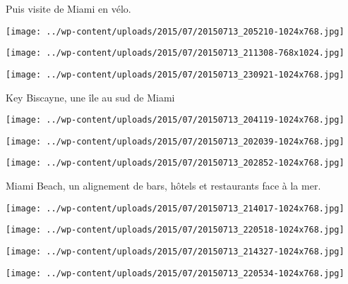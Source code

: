 Puis visite de Miami en vélo. 
\begin{center} \texttt{[image: ../wp-content/uploads/2015/07/20150713\_205210-1024x768.jpg]} \end{center}
\begin{center} \texttt{[image: ../wp-content/uploads/2015/07/20150713\_211308-768x1024.jpg]} \end{center}
\begin{center} \texttt{[image: ../wp-content/uploads/2015/07/20150713\_230921-1024x768.jpg]} \end{center}

Key Biscayne, une île au sud de Miami 
\begin{center} \texttt{[image: ../wp-content/uploads/2015/07/20150713\_204119-1024x768.jpg]} \end{center}
\begin{center} \texttt{[image: ../wp-content/uploads/2015/07/20150713\_202039-1024x768.jpg]} \end{center}
\begin{center} \texttt{[image: ../wp-content/uploads/2015/07/20150713\_202852-1024x768.jpg]} \end{center}
\pagebreak

Miami Beach, un alignement de bars, hôtels et restaurants face à la mer. 
\begin{center} \texttt{[image: ../wp-content/uploads/2015/07/20150713\_214017-1024x768.jpg]} \end{center}
\begin{center} \texttt{[image: ../wp-content/uploads/2015/07/20150713\_220518-1024x768.jpg]} \end{center}
\begin{center} \texttt{[image: ../wp-content/uploads/2015/07/20150713\_214327-1024x768.jpg]} \end{center}
\begin{center} \texttt{[image: ../wp-content/uploads/2015/07/20150713\_220534-1024x768.jpg]} \end{center}

